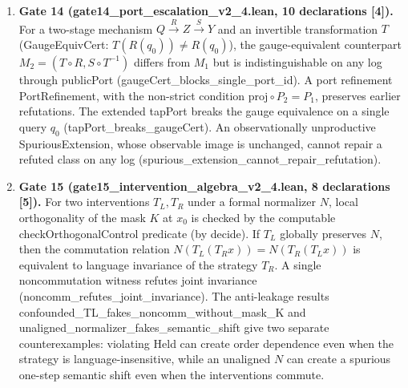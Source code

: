 \documentclass[11pt,a4paper]{article}
\begin{document}
\begin{enumerate}
\item \textbf{Gate 14 (gate14\_\allowbreak port\_\allowbreak escalation\_\allowbreak v2\_\allowbreak 4.lean, 10 declarations [4]).} For a two-stage mechanism \(Q\xrightarrow{R}Z\xrightarrow{S}Y\) and an invertible transformation \(T\) (GaugeEquivCert: \(T(R(q_0))\ne R(q_0)\)), the gauge-equivalent counterpart \(M_2=(T\circ R,S\circ T^{-1})\) differs from \(M_1\) but is indistinguishable on any log through publicPort (gaugeCert\_\allowbreak blocks\_\allowbreak single\_\allowbreak port\_\allowbreak id). A port refinement PortRefinement, with the non-strict condition \(\mathrm{proj}\circ P_2=P_1\), preserves earlier refutations. The extended tapPort breaks the gauge equivalence on a single query \(q_0\) (tapPort\_\allowbreak breaks\_\allowbreak gaugeCert). An observationally unproductive SpuriousExtension, whose observable image is unchanged, cannot repair a refuted class on any log (spurious\_\allowbreak extension\_\allowbreak cannot\_\allowbreak repair\_\allowbreak refutation).

\item \textbf{Gate 15 (gate15\_\allowbreak intervention\_\allowbreak algebra\_\allowbreak v2\_\allowbreak 4.lean, 8 declarations [5]).} For two interventions \(T_L,T_R\) under a formal normalizer \(N\), local orthogonality of the mask \(K\) at \(x_0\) is checked by the computable checkOrthogonalControl predicate (by decide). If \(T_L\) globally preserves \(N\), then the commutation relation \(N(T_L(T_R x))=N(T_R(T_L x))\) is equivalent to language invariance of the strategy \(T_R\). A single noncommutation witness refutes joint invariance (noncomm\_\allowbreak refutes\_\allowbreak joint\_\allowbreak invariance). The anti-leakage results confounded\_\allowbreak TL\_\allowbreak fakes\_\allowbreak noncomm\_\allowbreak without\_\allowbreak mask\_\allowbreak K and unaligned\_\allowbreak normalizer\_\allowbreak fakes\_\allowbreak semantic\_\allowbreak shift give two separate counterexamples: violating Held can create order dependence even when the strategy is language-insensitive, while an unaligned \(N\) can create a spurious one-step semantic shift even when the interventions commute.


\end{enumerate}
\end{document}
